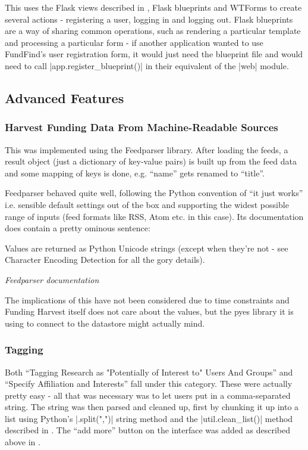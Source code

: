 This uses the Flask views described in , Flask blueprints and WTForms to create several actions - registering a user, logging in and logging out. Flask blueprints are a way of sharing common operations, such as rendering a particular template and processing a particular form - if another application wanted to use FundFind's user registration form, it would just need the blueprint file and would need to call |app.register_blueprint()| in their equivalent of the |web| module.

\subsection{Advanced Features}

\subsubsection{Harvest Funding Data From Machine-Readable Sources}
This was implemented using the Feedparser \cite{feedparser} library. After loading the feeds, a result object (just a dictionary of key-value pairs) is built up from the feed data and some mapping of keys is done, e.g. ``name'' gets renamed to ``title''.

Feedparser behaved quite well, following the Python convention of ``it just works'' i.e. sensible default settings out of the box and supporting the widest possible range of inputs (feed formats like RSS, Atom etc. in this case). Its documentation does contain a pretty ominous sentence:

\begin{shadequote}
Values are returned as Python Unicode strings (except when they're not - see Character Encoding Detection for all the gory details).
\par\emph{Feedparser documentation \cite{feedparser-ominous}}
\end{shadequote}

The implications of this have not been considered due to time constraints and Funding Harvest itself does not care about the values, but the pyes library it is using to connect to the datastore might actually mind.

\subsubsection{Tagging}
Both ``Tagging Research as "Potentially of Interest to" Users And Groups'' and ``Specify Affiliation and Interests'' fall under this category. These were actually pretty easy - all that was necessary was to let users put in a comma-separated string. The string was then parsed and cleaned up, first by chunking it up into a list using Python's |.split(",")|  string method and the |util.clean_list()| method described in . The ``add more'' button on the interface was added as described above in .

